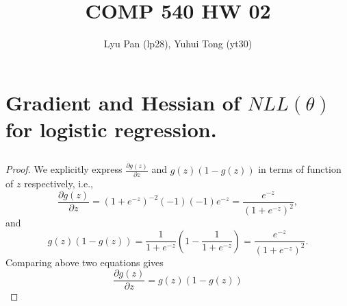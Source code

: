 \documentclass[english,11pt]{article}
\begin{document}
\title{COMP 540 HW 02 }

\author{Lyu Pan (lp28), Yuhui Tong (yt30)}
\maketitle




\section{Gradient and Hessian of $NLL(\theta)$ for logistic regression.}

\subsection{} %
\label{sec:1_1}
\begin{proof}
We explicitly express $\frac{\partial g(z)}{\partial z}$ and $g(z)\left(1-g(z)\right)$ in terms of function of $z$ respectively, i.e.,
\begin{equation}
\frac{\partial g(z)}{\partial z}=(1+e^{-z})^{-2}(-1)(-1)e^{-z}=\frac{e^{-z}}{(1+e^{-z})^{2}},
\end{equation}
and
\begin{equation}
g(z)\left(1-g(z)\right)=\frac{1}{1+e^{-z}}\left(1-\frac{1}{1+e^{-z}}\right)=\frac{e^{-z}}{(1+e^{-z})^{2}}.
\end{equation}
Comparing above two equations gives
\begin{equation}
\frac{\partial g(z)}{\partial z}=g(z)\left(1-g(z)\right)
\end{equation}
\end{proof}
\end{document}
